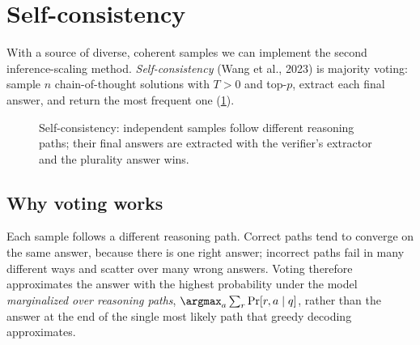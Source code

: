 \section{Self-consistency}\label{sec:scaling:sc}


With a source of diverse, coherent samples we can implement the second inference-scaling method.
\emph{Self-consistency} (Wang et al., 2023) is majority voting: sample $n$ chain-of-thought
solutions with $T > 0$ and top-$p$, extract each final answer, and return the most frequent one
(\cref{fig:scaling:vote}).

\begin{figure}[t]
\centering
{}
\caption{Self-consistency: independent samples follow different reasoning paths; their final
answers are extracted with the verifier's extractor and the plurality answer wins.}
\label{fig:scaling:vote}
\end{figure}

\subsection{Why voting works}
Each sample follows a different reasoning path. Correct paths tend to converge on the same answer,
because there is one right answer; incorrect paths fail in many different ways and scatter over
many wrong answers. Voting therefore approximates the answer with the highest probability under the
model \emph{marginalized over reasoning paths}, $\argmax_a \sum_{r} \Pr[r, a \mid q]$, rather than
the answer at the end of the single most likely path that greedy decoding approximates.

